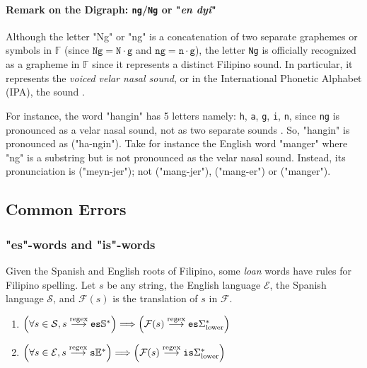 \paragraph{Remark on the Digraph: \texttt{ng}/\texttt{Ng} or "\textit{en dyi}"}

Although the letter "Ng" or "ng" is a concatenation of two separate graphemes or
symbols in \(\mathbb{F}\) (since \(\texttt{Ng} = \texttt{N}\cdot\texttt{g}\) and
\(\texttt{ng} = \texttt{n}\cdot\texttt{g}\)), the letter \texttt{Ng} is officially recognized
as a grapheme in \(\mathbb{F}\) since it represents a distinct Filipino sound.
In particular, it represents the \textit{voiced velar nasal sound}, or in the International
Phonetic Alphabet (IPA), the  sound \cite{Malabonga_2009}.

For instance, the word "hangin" has 5 letters namely: \texttt{h}, \texttt{a}, \texttt{g}, \texttt{i}, \texttt{n},
since \texttt{ng} is pronounced as a velar nasal sound, not as two separate sounds
. So, "hangin" is pronounced as  ("ha-ngin").
Take for instance the English  word "manger" where "ng" is a substring
but is not pronounced as the velar nasal sound. Instead, its pronunciation is
 ("meyn-jer"); not
 ("mang-jer"),
 ("mang-er") or
 ("manger").

\subsection{Common Errors}

\subsubsection{"es"-words and "is"-words}

Given the Spanish and English roots of Filipino, some \textit{loan} words have
rules for Filipino spelling. Let \(s\) be any string, the English language
\(\mathcal{E}\), the Spanish language \(\mathcal{S}\), and \(\mathcal{F}(s)\) is
the translation of \(s\) in \(\mathcal{F}\).

\begin{enumerate}
      \item \(\left(\forall s\in \mathcal{S},s \overset{\text{regex}}{\longrightarrow} \texttt{es}\mathbb{S}^*\right) \Longrightarrow \left(\mathcal{F}(s) \overset{\text{regex}}{\longrightarrow} \texttt{es}\Sigma_\text{lower}^*\right) \)
      \item \(\left(\forall s\in \mathcal{E},s \overset{\text{regex}}{\longrightarrow} \texttt{s}\mathbb{E}^*\right) \Longrightarrow  \left(\mathcal{F}(s) \overset{\text{regex}}{\longrightarrow} \texttt{is} \Sigma_\text{lower}^* \right)\)
\end{enumerate}

